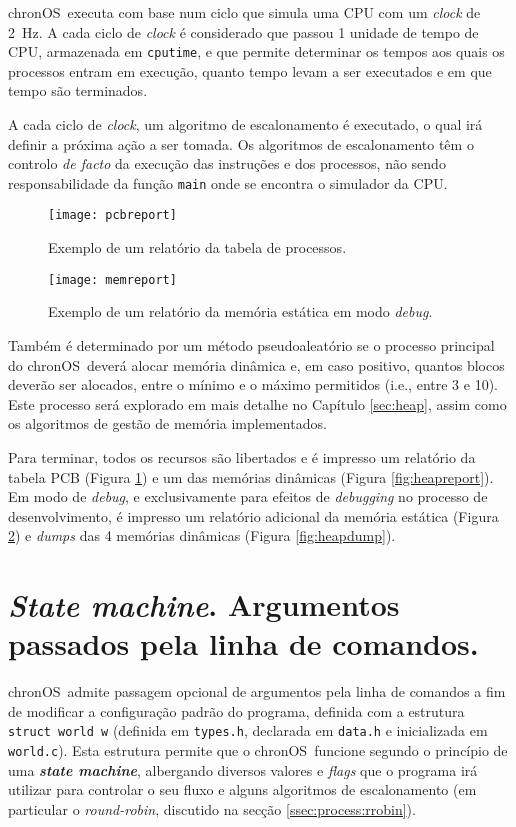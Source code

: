 \documentclass[10pt,oneside]{estiloUBI}
\newcommand{\chronOS}{\textsf{chronOS}}
\begin{document}
	\chronOS~executa com base num ciclo que simula uma \ac{CPU} com um \textit{clock} de \SI{2}{\hertz}. A cada ciclo de \textit{clock} é considerado que passou 1 unidade de tempo de \ac{CPU}, armazenada em \verb|cputime|, e que permite determinar os tempos aos quais os processos entram em execução, quanto tempo levam a ser executados e em que tempo são terminados.
	
	A cada ciclo de \textit{clock}, um algoritmo de escalonamento é executado, o qual irá definir a próxima ação a ser tomada. Os algoritmos de escalonamento têm o controlo \textit{de facto} da execução das instruções e dos processos, não sendo responsabilidade da função \verb|main| onde se encontra o simulador da \ac{CPU}.
	
	\begin{figure}[!btp]
		\centering
		\texttt{[image: pcbreport]}
		\caption{Exemplo de um relatório da tabela de processos.}
		\label{fig:pcbreport}
	\end{figure}
	
	\begin{figure}[!btp]
		\centering
		\texttt{[image: memreport]}
		\caption{Exemplo de um relatório da memória estática em modo \textit{debug}.}
		\label{fig:memreport}
	\end{figure}

	Também é determinado por um método pseudoaleatório se o processo principal do \chronOS~deverá alocar memória dinâmica e, em caso positivo, quantos blocos deverão ser alocados, entre o mínimo e o máximo permitidos (i.e., entre 3 e 10). Este processo será explorado em mais detalhe no Capítulo \ref{sec:heap}, assim como os algoritmos de gestão de memória implementados.

	Para terminar, todos os recursos são libertados e é impresso um relatório da tabela \ac{PCB} (Figura \ref{fig:pcbreport}) e um das memórias dinâmicas (Figura \ref{fig:heapreport}). Em modo de \textit{debug}, e exclusivamente para efeitos de \textit{debugging} no processo de desenvolvimento, é impresso um relatório adicional da memória estática (Figura \ref{fig:memreport}) e \textit{dumps} das 4 memórias dinâmicas (Figura \ref{fig:heapdump}).
	
	
	\section{\textit{State machine}. Argumentos passados pela linha de comandos.}
	\label{ssec:main:argv}
	
	\chronOS~admite passagem opcional de argumentos pela linha de comandos a fim de modificar a configuração padrão do programa, definida com a estrutura \texttt{struct world w} (definida em \verb|types.h|, declarada em \verb|data.h| e inicializada em \verb|world.c|). Esta estrutura permite que o \chronOS~funcione segundo o princípio de uma \textit{\textbf{state machine}}, albergando diversos valores e \textit{flags} que o programa irá utilizar para controlar o seu fluxo e alguns algoritmos de escalonamento (em particular o \textit{round-robin}, discutido na secção \ref{ssec:process:rrobin}).
	
\end{document}
